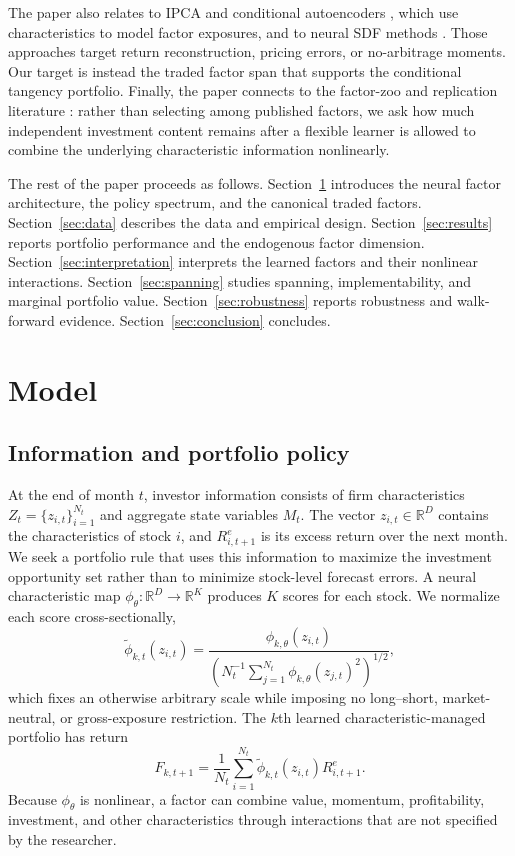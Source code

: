 \documentclass[12pt]{article}
\begin{document}
The paper also relates to IPCA \citep{kelly2019characteristics} and conditional autoencoders \citep{gu2021autoencoder}, which use characteristics to model factor exposures, and to neural SDF methods \citep{chen2024deep}. Those approaches target return reconstruction, pricing errors, or no-arbitrage moments. Our target is instead the traded factor span that supports the conditional tangency portfolio. Finally, the paper connects to the factor-zoo and replication literature \citep{harvey2016cross,jensen2023replication}: rather than selecting among published factors, we ask how much independent investment content remains after a flexible learner is allowed to combine the underlying characteristic information nonlinearly.

The rest of the paper proceeds as follows. Section~\ref{sec:model} introduces the neural factor architecture, the policy spectrum, and the canonical traded factors. Section~\ref{sec:data} describes the data and empirical design. Section~\ref{sec:results} reports portfolio performance and the endogenous factor dimension. Section~\ref{sec:interpretation} interprets the learned factors and their nonlinear interactions. Section~\ref{sec:spanning} studies spanning, implementability, and marginal portfolio value. Section~\ref{sec:robustness} reports robustness and walk-forward evidence. Section~\ref{sec:conclusion} concludes.

\section{Model}\label{sec:model}
\subsection{Information and portfolio policy}
At the end of month $t$, investor information consists of firm characteristics $Z_t=\{z_{i,t}\}_{i=1}^{N_t}$ and aggregate state variables $M_t$. The vector $z_{i,t}\in\mathbb{R}^{D}$ contains the characteristics of stock $i$, and $R^e_{i,t+1}$ is its excess return over the next month. We seek a portfolio rule that uses this information to maximize the investment opportunity set rather than to minimize stock-level forecast errors.
A neural characteristic map $\phi_\theta:\mathbb{R}^{D}\rightarrow\mathbb{R}^{K}$ produces $K$ scores for each stock. We normalize each score cross-sectionally,
\begin{equation}
\widetilde\phi_{k,t}(z_{i,t})=
\frac{\phi_{k,\theta}(z_{i,t})}
{\left(N_t^{-1}\sum_{j=1}^{N_t}\phi_{k,\theta}(z_{j,t})^2\right)^{1/2}},
\label{eq:score_normalization}
\end{equation}
which fixes an otherwise arbitrary scale while imposing no long--short, market-neutral, or gross-exposure restriction. The $k$th learned characteristic-managed portfolio has return
\begin{equation}
F_{k,t+1}=\frac{1}{N_t}\sum_{i=1}^{N_t}
\widetilde\phi_{k,t}(z_{i,t})R^e_{i,t+1}.
\label{eq:learned_factor}
\end{equation}
Because $\phi_\theta$ is nonlinear, a factor can combine value, momentum, profitability, investment, and other characteristics through interactions that are not specified by the researcher.
\end{document}
